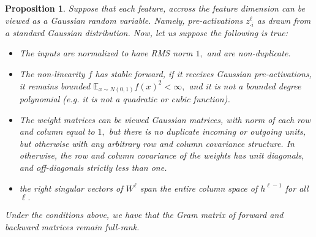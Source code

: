 \documentclass[11pt]{article}
\newcommand{\E}{\mathbb{E}}
\newtheorem{proposition}{Proposition}[section]
\begin{document}
\begin{proposition}
    Suppose that each feature, accross the feature dimension can be viewed as a Gaussian random variable. Namely, pre-activations $z^\ell_{\cdot i}$ as drawn from a standard Gaussian distribution. Now, let us suppose the following is true:
\begin{itemize}
    \item The inputs are normalized to have RMS norm $1,$ and are non-duplicate. 
    \item The non-linearity $f$ has stable forward, if it receives Gaussian pre-activations, it remains bounded $\E_{x\sim N(0,1)} f(x)^2 < \infty, $
    and it is not a bounded degree polynomial (e.g. it is not a quadratic or cubic function). 
    \item The weight matrices can be viewed Gaussian matrices, with norm of each row and column equal to $1,$ but there is no duplicate incoming or outgoing units, but otherwise with any arbitrary row and column covariance structure. In otherwise, the row and column covariance of the weights has unit diagonals, and off-diagonals strictly less than one. 
    \item the right singular vectors of $W^\ell$ span the entire column space of $h^{\ell-1}$ for all $\ell.$
\end{itemize}
Under the conditions above, we have that the Gram matrix of forward and backward matrices remain full-rank. 
\end{proposition}
\end{document}
